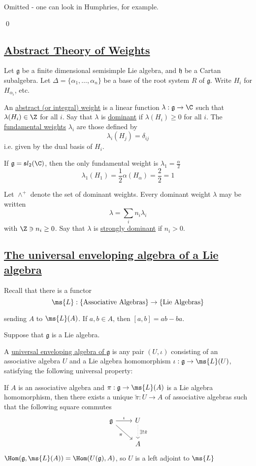 \documentclass[x11names,reqno,14pt]{extarticle}
\newcommand{\mk}[1]{\mathfrak{#1}}
\newcommand{\g}{\mk{g}}
\newcommand{\h}{\mk{h}}
\begin{document}
\proof

Omitted - one can look in Humphries, for example.

\qed

\subsection*{\underline{Abstract Theory of Weights}}

Let $\g$ be a finite dimensional semisimple Lie algebra, and $\h$ be a Cartan subalgebra. Let $\Delta = \{\alpha_1,\dots,\alpha_n\}$ be a base of the root system $R$ of $\g$. Write $H_i$ for $H_{\alpha_i}$, etc. 


An \underline{abstract (or integral) weight} is a linear function $\lambda:\g\to\C$ such that $\lambda(H_i) \in \Z$ for all $i$. Say that $\lambda$ is \underline{dominant} if $\lambda(H_i)\geq0$ for all $i$. The \underline{fundamental weights} $\lambda_i$ are those defined by 
\[
\lambda_i(H_j) = \delta_{ij}
\]
i.e. given by the dual basis of $H_i$. 

\exm

If $\g = \mk{s}l_2(\C)$, then the only fundamental weight is $\lambda_1 = \frac{\alpha}{2}$
\[
\lambda_1(H_1) = \frac12\alpha(H_\alpha) = \frac22=1
\]

Let $\wedge^+$ denote the set of dominant weights. Every dominant weight $\lambda$ may be written 
\[
\lambda = \sum_i n_i\lambda_i
\]
with $\Z\ni n_i \geq 0$. Say that $\lambda$ is \underline{strongly dominant} if $n_i > 0$. 

\subsection*{\underline{The universal enveloping algebra of a Lie algebra}}

Recall that there is a functor 
\[
\ms{L}:\{\text{Associative Algebras}\} \to \{\text{Lie Algebras}\}
\]

sending $A$ to $\ms{L}(A)$. If $a , b \in A$, then $[a,b] = ab - ba$. 

Suppose that $\g$ is a Lie algebra. 


A \underline{universal enveloping algebra of $\g$} is any pair $(U, \iota)$ consisting of an associative algebra $U$ and a Lie algebra homomorphism $\iota:\g\to\ms{L}(U)$, satisfying the following universal property:

If $A$ is an associative algebra and $\pi:\g\to\ms{L}(A)$ is a Lie algebra homomorphism, then there exists a unique $\tilde{\pi}:U\to A$ of associative algebras such that the following square commutes
\[
\begin{tikzcd}
\g \ar[r, "\iota"] \ar[dr, "\pi"']& U \ar[d, dotted, "\exists!\tilde{\pi}"]\\
& A
\end{tikzcd}
\]
$\Hom(\g, \ms{L}(A)) = \Hom(U(\g), A)$, so $U$ is a left adjoint to $\ms{L}$
\end{document}
